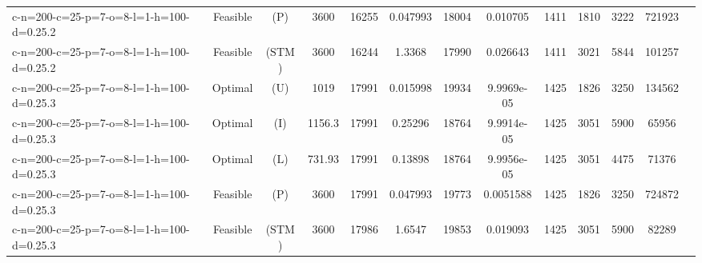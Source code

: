 \documentclass[landscape, a4paper]{article}
\newcommand{\STM}{\ensuremath{\mathrm{STM}}}
\newcommand{\Improved}{\ensuremath{\mathrm{I}}}
\newcommand{\Loose}{\ensuremath{\mathrm{L}}}
\newcommand{\Profit}{\ensuremath{\mathrm{P}}}
\newcommand{\Utility}{\ensuremath{\mathrm{U}}}
\begin{document}
\begin{center}
\begin{tabular}{lcccccccccccc}
c-n=200-c=25-p=7-o=8-l=1-h=100-d=0.25.2 & Feasible & (\Profit) & 3600 & 16255 & 0.047993 & 18004 & 0.010705 & 1411 & 1810 & 3222 & 721923 & \\
c-n=200-c=25-p=7-o=8-l=1-h=100-d=0.25.2 & Feasible & (\STM) & 3600 & 16244 & 1.3368 & 17990 & 0.026643 & 1411 & 3021 & 5844 & 101257 & \\
c-n=200-c=25-p=7-o=8-l=1-h=100-d=0.25.3 & Optimal & (\Utility) & 1019 & 17991 & 0.015998 & 19934 & 9.9969e-05 & 1425 & 1826 & 3250 & 134562 & \\
c-n=200-c=25-p=7-o=8-l=1-h=100-d=0.25.3 & Optimal & (\Improved) & 1156.3 & 17991 & 0.25296 & 18764 & 9.9914e-05 & 1425 & 3051 & 5900 & 65956 & \\
c-n=200-c=25-p=7-o=8-l=1-h=100-d=0.25.3 & Optimal & (\Loose) & 731.93 & 17991 & 0.13898 & 18764 & 9.9956e-05 & 1425 & 3051 & 4475 & 71376 & \\
c-n=200-c=25-p=7-o=8-l=1-h=100-d=0.25.3 & Feasible & (\Profit) & 3600 & 17991 & 0.047993 & 19773 & 0.0051588 & 1425 & 1826 & 3250 & 724872 & \\
c-n=200-c=25-p=7-o=8-l=1-h=100-d=0.25.3 & Feasible & (\STM) & 3600 & 17986 & 1.6547 & 19853 & 0.019093 & 1425 & 3051 & 5900 & 82289 & \\
\end{tabular}
\end{center}
\end{document}
